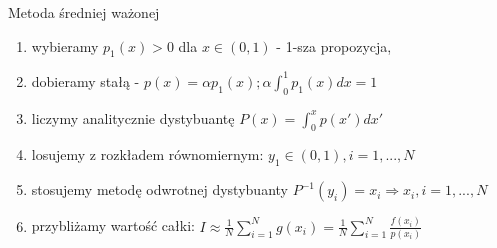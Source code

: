 \begin{frame}{Metoda średniej ważonej}
        \begin{enumerate}
        	\item wybieramy $p_1(x) > 0$ dla $x \in(0,1)$ - 1-sza propozycja,
            \item dobieramy stałą - $p(x) = \alpha p_1(x); \alpha \int_0^1 p_1(x) dx = 1$
            \item liczymy analitycznie dystybuantę $P(x) = \int_0^x p(x') dx'$
            \item             losujemy z rozkładem równomiernym: $y_1 \in (0, 1), i = 1, ..., N$
            \item stosujemy metodę odwrotnej dystybuanty $P^{-1}(y_i) = x_i \Rightarrow x_i, i = 1, ..., N$
            \item przybliżamy wartość całki: $I \approx \frac{1}{N} \sum_{i=1}^N g(x_i)=\frac{1}{N} \sum_{i=1}^N \frac{f(x_i)}{p(x_i)}$
        \end{enumerate}
\end{frame}
